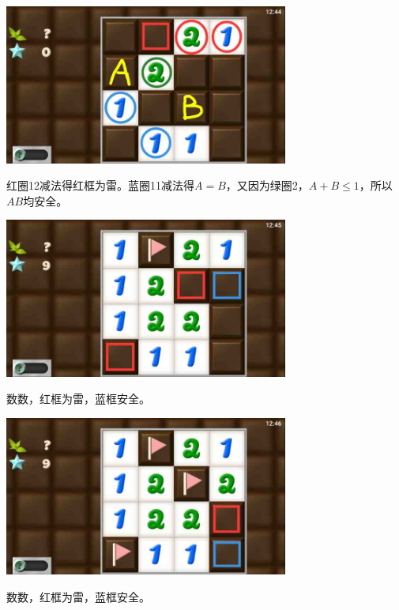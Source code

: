 \subsection{} %
\begin{center}
    \includegraphics[width=0.7\textwidth]{puzzlelow/134-1.jpg}
\end{center}
红圈12减法得红框为雷。蓝圈11减法得$A=B$，又因为绿圈2，$A+B\le 1$，所以$AB$均安全。
\begin{center}
    \includegraphics[width=0.7\textwidth]{puzzlelow/134-2.jpg}
\end{center}
数数，红框为雷，蓝框安全。
\begin{center}
    \includegraphics[width=0.7\textwidth]{puzzlelow/134-3.jpg}
\end{center}
数数，红框为雷，蓝框安全。

